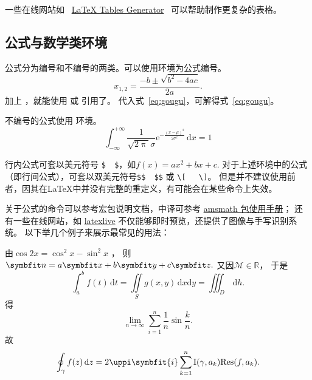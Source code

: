 一些在线网站如
~\href{http://www.tablesgenerator.com}{LaTeX Tables Generator}~
可以帮助制作更复杂的表格。

\subsection{公式与数学类环境}\label{subsec:eqandmath}
公式分为编号和不编号的两类。可以使用环境为公式编号。
\begin{equation}\label{eq:gougu}
	x_{1,2}=\frac{-b \pm \sqrt{b^2-4ac}}{2a}.
\end{equation}
加上 ，就能使用 或 引用了。
代入式~\ref{eq:gougu}，可解得式~\eqref{eq:gougu}。

不编号的公式使用  环境。
\begin{equation*}
	\int_{-\infty}^{+\infty}\frac{1}{\sqrt{2\uppi}\sigma}		%
	\mathrm{e}^{-\tfrac{(x-\mu)^2}{2\sigma^2}} \,\mathrm{d}x =1
\end{equation*}

行内公式可套以美元符号 \verb+$  $+，如$f(x)=ax^2+bx+c$.
对于上述环境中的公式（即行间公式），可套以双美元符号\verb+$$  $$+
或 \verb+\[   \]+。
但是并不建议使用前者，因其在\LaTeX{}中并没有完整的重定义，有可能会在某些命令上失效。

关于公式的命令可以参考宏包说明文档，中译可参考 \href{http://static.latexstudio.net/article/2019/0204/amsmath-guide-zh-cn.pdf}{amsmath 包使用手册}；
还有一些在线网站，如 \href{https://latexlive.com/}{latexlive} 不仅能够即时预览，还提供了图像与手写识别系统。
以下举几个例子来展示最常见的用法：

由$\cos 2x=\cos^2x-\sin^2x$ ，	%
则$\Vector{n}=a\Vector{x}+b\Vector{y}+c\Vector{z}.$	%
又因$\mathcal{M}\in \mathbb{R}$，			%
于是
\[
	\int_a^b f(t)\,\mathrm{d}t = \iint\limits_S g(x,y)\,\mathrm{d}x\mathrm{d}y
	= \iiint\nolimits_D\, \mathrm{d}h.	%
\]
得
$$\lim_{n \to \infty}\sum_{i=1}^n{\frac{1}{n}}\sin\frac{k}{n}.$$	%
故
\begin{equation}\label{eq:res}
	\oint_{\gamma}f(z)\,\mathrm{d}z=2\uppi\symbfit{i}\sum^n_{k=1}\mathrm{I}(\gamma,a_k)\mathrm{Res}(f,a_k).
\end{equation}

